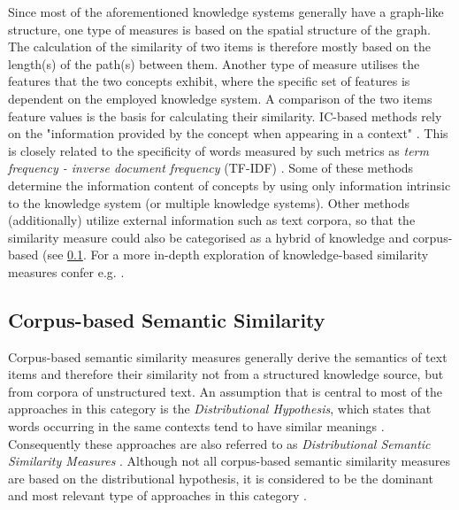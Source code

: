 \documentclass[11pt]{scrreprt}
\let\citef\cite  %
\let\cite\parencite  %
\begin{document}
Since most of the aforementioned knowledge systems generally have a graph-like structure, one type of measures is based on the spatial structure of the graph. The calculation of the similarity of two items is therefore mostly based on the length(s) of the path(s) between them. Another type of measure  utilises the features that the two concepts exhibit, where the specific set of features is dependent on the employed knowledge system. A comparison of the two items feature values is the basis for calculating their similarity. IC-based methods rely on the "information provided by the concept when appearing in a context" \cite{sanchezSemanticSimilarityMethod2013}. This is closely related to the specificity of words measured by such metrics as \textit{term frequency - inverse document frequency} (TF-IDF) \cite{aizawaInformationtheoreticPerspectiveTf2003}. Some of these methods determine the information content of concepts by using only information intrinsic to the knowledge system (or multiple knowledge systems). Other methods (additionally) utilize external information such as text corpora, so that the similarity measure could also be categorised as a hybrid of knowledge and corpus-based (see \cref{sec:corpus-based-semantic-similarity}. For a more in-depth exploration of knowledge-based similarity measures confer e.g. \citef{chandrasekaranEvolutionSemanticSimilarity2021, harispeSemanticSimilarityNatural2015, zhuComputingSemanticSimilarity2017, mihalceaCorpusbasedKnowledgebasedMeasures2006}.



\subsection{Corpus-based Semantic Similarity}
\label{sec:corpus-based-semantic-similarity}
Corpus-based semantic similarity measures generally derive the semantics of text items and therefore their similarity not from a structured knowledge source, but from corpora of unstructured text. An assumption that is central to most of the approaches in this category is the \textit{Distributional Hypothesis}, which states that words occurring in the same contexts tend to have similar meanings \cite{harrisDistributionalStructure1954}. Consequently these approaches are also referred to as \textit{Distributional Semantic Similarity Measures} \cite{mohammadDistributionalMeasuresSemantic2012}. Although not all corpus-based semantic similarity measures are based on the distributional hypothesis, it is considered to be the dominant and most relevant type of approaches in this category \cite[Section 2.4]{harispeSemanticSimilarityNatural2015}.
\end{document}
